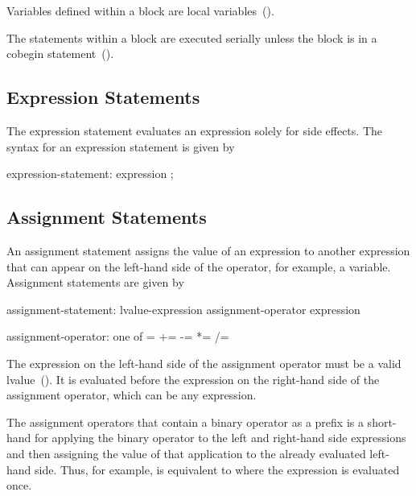 Variables defined within a block are local
variables~().

The statements within a block are executed serially unless the block
is in a cobegin statement~().

\subsection{Expression Statements}
\label{Expression_Statements}

The expression statement evaluates an expression solely for side
effects. The syntax for an expression statement is given by
\begin{syntax}
expression-statement:
  expression ;
\end{syntax}

\subsection{Assignment Statements}
\label{Assignment_Statements}

An assignment statement assigns the value of an expression to another
expression that can appear on the left-hand side of the operator, for
example, a variable.  Assignment statements are given by

\begin{syntax}
assignment-statement:
  lvalue-expression assignment-operator expression

assignment-operator: one of
   = += -= *= /= %
\end{syntax}

The expression on the left-hand side of the assignment operator must
be a valid lvalue~().  It is evaluated before the
expression on the right-hand side of the assignment operator, which
can be any expression.

The assignment operators that contain a binary operator as a prefix is
a short-hand for applying the binary operator to the left and
right-hand side expressions and then assigning the value of that
application to the already evaluated left-hand side.  Thus, for
example,  is equivalent to  where the
expression  is evaluated once.

